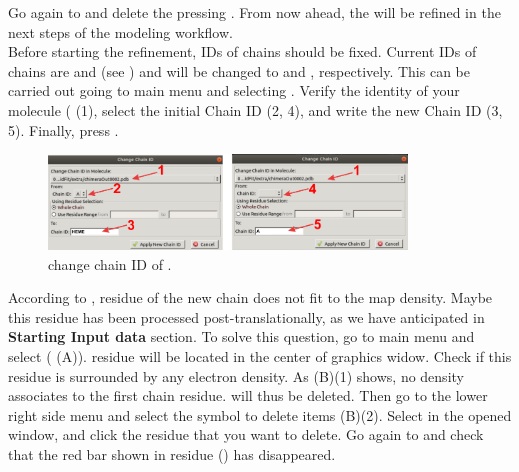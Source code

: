   Go again to  and delete the   pressing . From now ahead, the   will be refined in the next steps of the modeling workflow.\\
  
  Before starting the refinement, IDs of chains should be fixed. Current IDs of chains are  and  (see ) and will be changed to  and , respectively. This can be carried out going to main \coot menu and selecting . Verify the identity of your  molecule ( (1), select the initial Chain ID (2, 4), and write the new Chain ID (3, 5). Finally, press .
 
 \begin{figure}[H]
  \centering 
  \captionsetup{width=.7\linewidth} 
  \includegraphics[width=0.85\textwidth]{Images/Fig26}
  \caption{\coot change chain ID of  .}
  \label{fig:coot_change_name_ID}
  \end{figure}
  
  According to ,  residue of the new chain  does not fit to the map density. Maybe this residue has been processed post-translationally, as we have anticipated in \textbf{Starting Input data} section. To solve this question, go to \coot main menu and select  ( (A)).  residue will be located in the center of \coot graphics widow. Check if this residue is surrounded by any electron density. As  (B)(1) shows, no density associates to the first chain residue.  will thus be deleted. Then go to the lower right side menu and select the symbol to delete items (B)(2). Select  in the opened  window, and click the  residue that you want to delete. Go again to  and check that the red bar shown in  residue () has disappeared.
  
